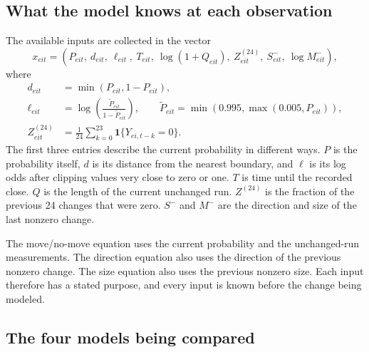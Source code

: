 \documentclass[10pt,twoside]{article}
\begin{document}
\subsection{What the model knows at each observation}

The available inputs are collected in the vector
\begin{equation}
  x_{e i t}=\left(
  P_{e i t},\ d_{e i t},\ \ell_{e i t},\ T_{e i t},\
  \log(1+Q_{e i t}),\ Z^{(24)}_{e i t},\ S^{-}_{e i t},\ \log M^{-}_{e i t}
  \right),
  \label{eq:state-vector}
\end{equation}
where
\begin{align}
  d_{e i t}&=\min(P_{e i t},1-P_{e i t}), \\
  \ell_{e i t}&=\log\!\left(\frac{\widetilde P_{e i t}}{1-\widetilde P_{e i t}}\right),
  \qquad \widetilde P_{e i t}=\min(0.995,\max(0.005,P_{e i t})), \\
  Z^{(24)}_{e i t}&=\frac{1}{24}\sum_{k=0}^{23}\mathbf 1\{Y_{e i,t-k}=0\}.
\end{align}
The first three entries describe the current probability in different ways. $P$ is the probability itself, $d$ is its distance from the nearest boundary, and $\ell$ is its log odds after clipping values very close to zero or one. $T$ is time until the recorded close. $Q$ is the length of the current unchanged run. $Z^{(24)}$ is the fraction of the previous 24 changes that were zero. $S^{-}$ and $M^{-}$ are the direction and size of the last nonzero change.

The move/no-move equation uses the current probability and the unchanged-run measurements. The direction equation also uses the direction of the previous nonzero change. The size equation also uses the previous nonzero size. Each input therefore has a stated purpose, and every input is known before the change being modeled.

\subsection{The four models being compared}
\end{document}
